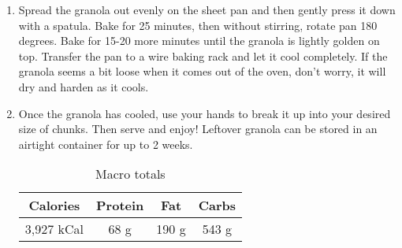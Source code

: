 \documentclass{report}
\begin{document}
\begin{multicols}{2}
\begin{enumerate}
\item Spread the granola out evenly on the sheet pan and then gently press it down with a spatula. Bake for 25 minutes, then without stirring, rotate pan 180 degrees. Bake for 15-20 more minutes until the granola is lightly golden on top. Transfer the pan to a wire baking rack and let it cool completely. If the granola seems a bit loose when it comes out of the oven, don’t worry, it will dry and harden as it cools.

\item Once the granola has cooled, use your hands to break it up into your desired size of chunks. Then serve and enjoy! Leftover granola can be stored in an airtight container for up to 2 weeks.

\begin{table}[H]
  \begin{center}
    \caption{Macro totals}
    \label{tab:table1}
    \begin{tabular}{c|c|c|c} %
      \textbf{Calories} & \textbf{Protein} & \textbf{Fat} & \textbf{Carbs}\\
      \hline
      3,927 kCal & 68 g & 190 g & 543 g\\
    \end{tabular}
  \end{center}
\end{table}
 
\end{enumerate}
\end{multicols}




\end{document}
